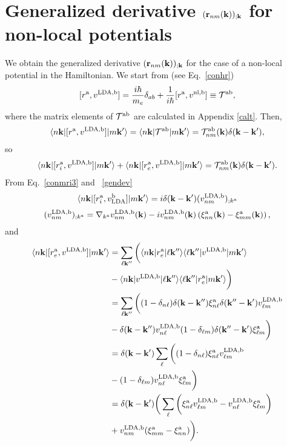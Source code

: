 \section{Generalized derivative \texorpdfstring{$(\mathbf{r}_{nm}(\mathbf{k}))_{;\mathbf{k}}$}
{{rnm};k} for non-local potentials}\label{gdernl}

We obtain the generalized derivative $(\mathbf{r}_{nm}(\mathbf{k}))_{;\mathbf{k}}$ for
the case of a non-local potential in the Hamiltonian.
We start from (see Eq.~\eqref{conhr})
\begin{align}\label{na_hrdab}
[r^{\mathrm{a}},v^{\mathrm{LDA},\mathrm{b}}]= 
\frac{i\hbar}{m_e}\delta_{ab}+
\frac{1}{i\hbar}[r^{\mathrm{a}},v^{\mathrm{nl},\mathrm{b}}]
\equiv
{\cal T}^{\mathrm{a}\mathrm{b}}
,
\end{align} 
where the matrix elements of ${\cal T}^{\mathrm{a}\mathrm{b}}$ are calculated in
Appendix \ref{calt}.
Then,
\begin{align}\label{na_hrdab2}
\langle n\mathbf{k} |[r^{\mathrm{a}},v^{\mathrm{LDA},\mathrm{b}}]| m\mathbf{k}' \rangle
=
\langle n\mathbf{k} |{\cal T}^{\mathrm{a}\mathrm{b}}| m\mathbf{k}' \rangle
=
{\cal T}^{\mathrm{a}\mathrm{b}}_{nm}(\mathbf{k})\delta(\mathbf{k}-\mathbf{k}')
,
\end{align}
so
\begin{align}\label{na_hrdab3}
\langle n\mathbf{k} |[r^{\mathrm{a}}_i,v^{\mathrm{LDA},\mathrm{b}}]| m\mathbf{k}' \rangle
+
\langle n\mathbf{k} |[r^{\mathrm{a}}_e,v^{\mathrm{LDA},\mathrm{b}}]| m\mathbf{k}' \rangle
=
{\cal T}^{\mathrm{a}\mathrm{b}}_{nm}(\mathbf{k})\delta(\mathbf{k}-\mathbf{k}')
.
\end{align}
From Eq.~\eqref{conmri3} and ~\eqref{gendev}
\begin{align}\label{na_rip}
\langle n\mathbf{k} |[r^{\mathrm{a}}_i,v_{\mathrm{LDA}}^{\mathrm{b}}]| m\mathbf{k}' \rangle
=i\delta(\mathbf{k}-\mathbf{k}')(v_{nm}^{\mathrm{LDA},\mathrm{b}})_{;k^{\mathrm{a}}}
\end{align}
\begin{align}\label{na_ripn}
(v^{\mathrm{LDA},\mathrm{b}}_{nm})_{;k^{\mathrm{a}}}=
\nabla_{k^{\mathrm{a}}}
v^{\mathrm{LDA},\mathrm{b}}_{n m}(\mathbf{k})
-
i
v^{\mathrm{LDA},\mathrm{b}}_{nm}(\mathbf{k})
\left(
\xi^{\mathrm{a}}_{nn}(\mathbf{k})
-
\xi^{\mathrm{a}}_{mm}(\mathbf{k})
\right)
,
\end{align}
and
\begin{align}\label{na_rep}
\langle n\mathbf{k} |[r^{\mathrm{a}}_e,v^{\mathrm{LDA},\mathrm{b}}]| m\mathbf{k}' \rangle&=
\sum_{\ell\mathbf{k}''}
\bigg(
\langle n\mathbf{k} |r^{\mathrm{a}}_e| \ell\mathbf{k}'' \rangle\langle \ell\mathbf{k}'' |v^{\mathrm{LDA},\mathrm{b}}| m\mathbf{k}' \rangle
\nonumber \\
&
-
\langle n\mathbf{k} |v^{\mathrm{LDA},\mathrm{b}}| \ell\mathbf{k}'' \rangle\langle \ell\mathbf{k}'' |r^{\mathrm{a}}_e| m\mathbf{k}' \rangle
\bigg)
\nonumber \\
&=
\sum_{\ell\mathbf{k}''}
\bigg(
(1-\delta_{n\ell})\delta(\mathbf{k}-\mathbf{k}'')\xi^{\mathrm{a}}_{n\ell}
\delta(\mathbf{k}''-\mathbf{k}')v^{\mathrm{LDA},\mathrm{b}}_{\ell m}
\nonumber \\
&-
\delta(\mathbf{k}-\mathbf{k}'')v^{\mathrm{LDA},\mathrm{b}}_{n\ell}
(1-\delta_{\ell m})\delta(\mathbf{k}''-\mathbf{k}')\xi^{\mathrm{a}}_{\ell m}
\bigg)
\nonumber \\
&=
\delta(\mathbf{k}-\mathbf{k}')
\sum_{\ell}
\bigg(
(1-\delta_{n\ell})
\xi^{\mathrm{a}}_{n\ell}
v^{\mathrm{LDA},\mathrm{b}}_{\ell m}
\nonumber \\
&-
(1-\delta_{\ell m})
v^{\mathrm{LDA},\mathrm{b}}_{n\ell}
\xi^{\mathrm{a}}_{\ell m}
\bigg)
\nonumber \\
&=
\delta(\mathbf{k}-\mathbf{k}')
\bigg(
\sum_{\ell}
\bigg(
\xi^{\mathrm{a}}_{n\ell}
v^{\mathrm{LDA},\mathrm{b}}_{\ell m}
-
v^{\mathrm{LDA},\mathrm{b}}_{n\ell}
\xi^{\mathrm{a}}_{\ell m}
\bigg)
\nonumber \\
&+
v^{\mathrm{LDA},\mathrm{b}}_{nm}(\xi^{\mathrm{a}}_{mm}
-
\xi^{\mathrm{a}}_{nn}
)
\bigg)
.
\end{align}
